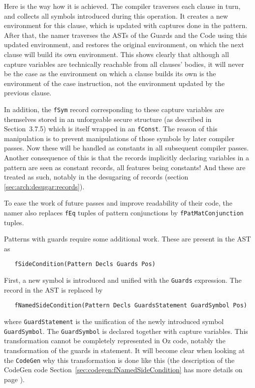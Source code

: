 \documentclass[a4paper]{memoir}
\begin{document}
Here is the way how it is achieved. The compiler traverses each clause in turn,
and collects all symbols introduced during this operation. It creates a new
environment for this clause, which is updated with captures done in the
pattern. After that, the namer traverses the ASTs of the Guards and the Code
using this updated environment, and restores the original environment, on which
the next clause will build its own environment. This shows clearly that
although all capture variables are technically reachable from all clauses'
bodies, it will never be the case as the environment on which a clause builds
its own is the environment of the case instruction, not the environment updated
by the previous clause. 

In addition, the \lstinline!fSym! record corresponding to these capture
variables are themselves stored in an unforgeable secure structure (as
described in \cite{CTMCP} Section~3.7.5) which is itself wrapped in an
\lstinline!fConst!. The reason of this manipulation is to prevent manipulations
of those symbols by later compiler passes. Now these will be handled as
constants in all subsequent compiler passes. Another consequence of this is
that the records implicitly declaring variables in a pattern are seen as
constant records, all features being constants! And these are treated as such,
notably in the desugaring of records (section \ref{sec:arch:desugar:records}).

To ease the work of future passes and improve readability of their code, the
namer also replaces \lstinline!fEq! tuples of pattern conjunctions by
\lstinline!fPatMatConjunction! tuples.

Patterns with guards require some additional work. These are present in the AST
as 
\begin{lstlisting}
   fSideCondition(Pattern Decls Guards Pos)
\end{lstlisting}
First, a new symbol is
introduced and unified with the \lstinline!Guards! expression. The record in the
AST is replaced by 
\begin{lstlisting}
   fNamedSideCondition(Pattern Decls GuardsStatement GuardSymbol Pos)
\end{lstlisting}
where \lstinline!GuardStatement! is the unification of the newly
introduced symbol \\\lstinline!GuardSymbol!. The \lstinline!GuardSymbol! is
declared together with capture variables. 
This transformation cannot be completely represented in Oz code, notably the
transformation of the guards in statement. It will become clear when looking at
the \lstinline!CodeGen! why this transformation is done like this (the
description of the CodeGen code Section~\ref{sec:codegen:fNamedSideCondition} has more
details on page \pageref{sec:codegen:fNamedSideCondition}).
\end{document}
